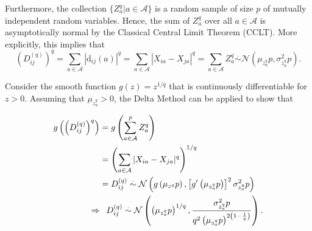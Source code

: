 \documentclass[aoas]{imsart}
\begin{document}
Furthermore, the collection $\{Z^q_a | a \in \mathcal{A}\}$ is a random sample of size $p$ of mutually independent random variables. Hence, the sum of $Z^q_a$ over all $a \in \mathcal{A}$ is asymptotically normal by the Classical Central Limit Theorem (CCLT). More explicitly, this implies that
%
\begin{equation}\label{eq:DqAsympt}
\left(D^{(q)}_{ij}\right)^q = \sum_{a \in \mathcal{A}} |\text{d}_{ij}(a)|^q = \sum_{a \in \mathcal{A}} |X_{ia} - X_{ja}|^q = \sum_{a \in \mathcal{A}} Z^q_a \overset{.}{\sim} \mathcal{N}\left(\mu_{z^q_a}p,\sigma^2_{z^q_a}p\right).
\end{equation}

Consider the smooth function $g(z) = z^{1/q}$ that is continuously differentiable for $z>0$. Assuming that $\mu_{z^q_a}>0$, the Delta Method \cite{allStats} can be applied to show that 

\begin{equation}\label{eq:DqDeltaMethod}
\begin{aligned}
g\left(\left(D^{(q)}_{ij}\right)^q\right) &= g\left(\displaystyle \sum_{a \in \mathcal{A}}^{p}Z^q_a\right) \\
&= \left(\sum_{a \in \mathcal{A}} |X_{ia} - X_{ja}|^q\right)^{1/q} \\
&= D^{(q)}_{ij} \overset{.}{\sim} \mathcal{N}\left(g\left(\mu_{z^q}p\right),\left[g^\prime \left(\mu_{z^q_a}p\right)\right]^2\sigma^2_{z^q_a}p\right) \\
\Rightarrow &\hphantom{=} D^{(q)}_{ij} \overset{.}{\sim} \mathcal{N}\left(\left(\mu_{z^q_a}p\right)^{1/q},\frac{\sigma^2_{z^q_a}p}{q^2\left(\mu_{z^q_a}p\right)^{2\left(1 - \frac{1}{q}\right)}}\right).
\end{aligned}
\end{equation}
\end{document}
